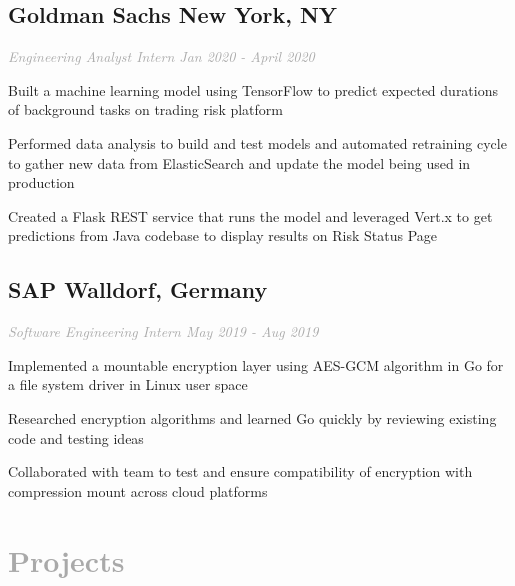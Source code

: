 \documentclass{article}
\begin{document}
{{	\subsection{{\bfseries\large Goldman Sachs} \hfill New York, NY}
	\textit{\textcolor{darkgray}{Engineering Analyst Intern \hfill \textit{Jan 2020 - April 2020}}}
	\begin{myitemize}
		\item Built a machine learning model using TensorFlow to predict expected durations of background tasks on trading risk platform
		\item Performed data analysis to build and test models and automated retraining cycle to gather new data from ElasticSearch and update the model being used in production
		\item Created a Flask REST service that runs the model and leveraged Vert.x to get predictions from Java codebase to display results on Risk Status Page
	\end{myitemize}

	\subsection{{\bfseries\large SAP} \hfill Walldorf, Germany}
	\textit{\textcolor{darkgray}{Software Engineering Intern \hfill \textit{May 2019 - Aug 2019}}}
	\begin{myitemize}
		\item Implemented a mountable encryption layer using AES-GCM algorithm in Go for a file system driver in Linux user space
		\item Researched encryption algorithms and learned Go quickly by reviewing existing code and testing ideas
		\item Collaborated with team to test and ensure compatibility of encryption with compression mount across cloud platforms
	\end{myitemize}
	

\section[Projects \hfill]{\textcolor{darkgray}{Projects \sout{\hfill}}}

}}
\end{document}

